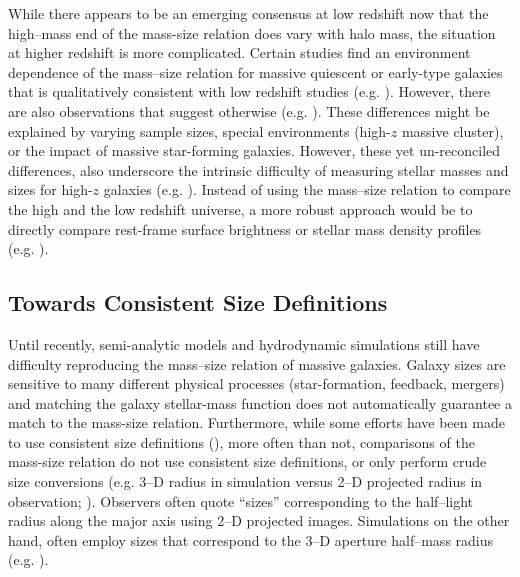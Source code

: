 \documentclass[a4paper,fleqn,usenatbib]{mnras}
\begin{document}
    While there appears to be an emerging consensus at low redshift now that the 
    high--mass end of the mass-size relation does vary with halo mass, the situation at 
    higher redshift is more complicated. 
    Certain studies find an environment dependence of the mass--size relation for 
    massive quiescent or early-type galaxies that is qualitatively consistent with low 
    redshift studies (e.g. \citealt{Papovich2012, Lani2013, Strazzullo2013, 
    Delaye2014}). 
    However, there are also observations that suggest otherwise (e.g. 
    \citealt{Rettura2010, Raichoor2012, Kelkar2015, Allen2015}). 
    These differences might be explained by varying sample sizes, special environments
    (high-$z$ massive cluster), or the impact of massive star-forming galaxies. 
    However, these yet un-reconciled differences, also underscore the intrinsic 
    difficulty of measuring stellar masses and sizes for high-$z$ galaxies 
    (e.g. \citealt{Price2017}). 
    Instead of using the mass--size relation to compare the high and the low redshift 
    universe, a more robust approach would be to directly compare rest-frame surface 
    brightness or stellar mass density profiles (e.g. \citealt{Szomoru2012, Patel2013,
    Buitrago2017, Hill2017}).
    
\subsection{Towards Consistent Size Definitions}
        
    Until recently, semi-analytic models and hydrodynamic simulations still have 
    difficulty reproducing the mass--size relation of massive galaxies. 
    Galaxy sizes are sensitive to many different physical processes (star-formation, 
    feedback, mergers) and matching the galaxy stellar-mass function does not 
    automatically guarantee a match to the mass-size relation. 
    Furthermore, while some efforts have been made to use consistent size definitions 
    (\citealt{McCarthy2017}), more often than not, comparisons of the mass-size relation 
    do not use consistent size definitions, or only perform crude size conversions 
    (e.g. 3--D radius in simulation versus 2--D projected radius in observation; 
    \citealt{Genel2017}). 
    Observers often quote ``sizes'' corresponding to the half--light radius along the 
    major axis using 2--D projected images. 
    Simulations on the other hand, often employ sizes that correspond to the 3--D 
    aperture half--mass radius (e.g. \citealt{Price2017}). 
    
\end{document}
